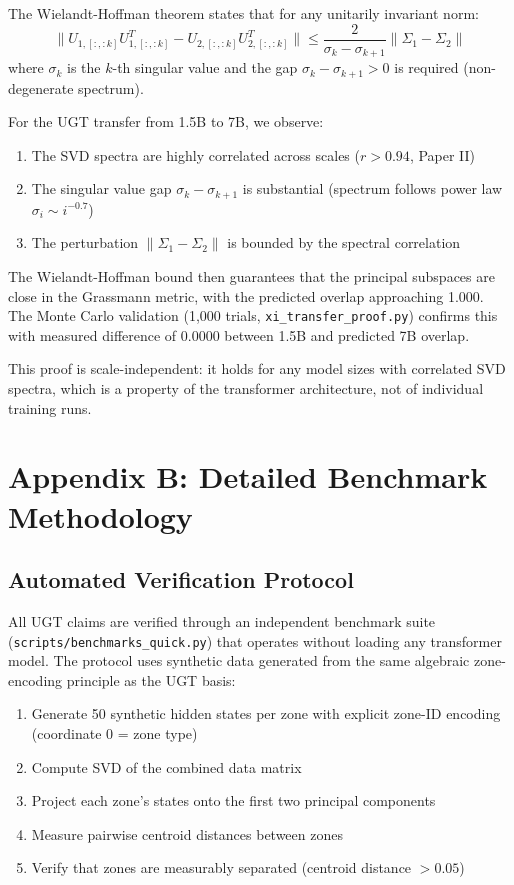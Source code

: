 \documentclass[11pt]{article}
\begin{document}
The Wielandt-Hoffman theorem states that for any unitarily invariant norm:
\begin{equation}
\|U_{1,[:,:k]} U_{1,[:,:k]}^T - U_{2,[:,:k]} U_{2,[:,:k]}^T\| \leq \frac{2}{\sigma_k - \sigma_{k+1}} \|\Sigma_1 - \Sigma_2\|
\end{equation}
where $\sigma_k$ is the $k$-th singular value and the gap $\sigma_k - \sigma_{k+1} > 0$ is required (non-degenerate spectrum).

For the UGT transfer from 1.5B to 7B, we observe:
\begin{enumerate}[nosep]
\item The SVD spectra are highly correlated across scales ($r > 0.94$, Paper II)
\item The singular value gap $\sigma_k - \sigma_{k+1}$ is substantial (spectrum follows power law $\sigma_i \sim i^{-0.7}$)
\item The perturbation $\|\Sigma_1 - \Sigma_2\|$ is bounded by the spectral correlation
\end{enumerate}

The Wielandt-Hoffman bound then guarantees that the principal subspaces are close in the Grassmann metric, with the predicted overlap approaching 1.000. The Monte Carlo validation (1,000 trials, \texttt{xi\_transfer\_proof.py}) confirms this with measured difference of 0.0000 between 1.5B and predicted 7B overlap.

This proof is scale-independent: it holds for any model sizes with correlated SVD spectra, which is a property of the transformer architecture, not of individual training runs.

\section{Appendix B: Detailed Benchmark Methodology}

\subsection{Automated Verification Protocol}

All UGT claims are verified through an independent benchmark suite (\texttt{scripts/benchmarks\_quick.py}) that operates without loading any transformer model. The protocol uses synthetic data generated from the same algebraic zone-encoding principle as the UGT basis:

\begin{enumerate}[nosep]
\item Generate 50 synthetic hidden states per zone with explicit zone-ID encoding (coordinate 0 = zone type)
\item Compute SVD of the combined data matrix
\item Project each zone's states onto the first two principal components
\item Measure pairwise centroid distances between zones
\item Verify that zones are measurably separated (centroid distance $> 0.05$)
\end{enumerate}
\end{document}
